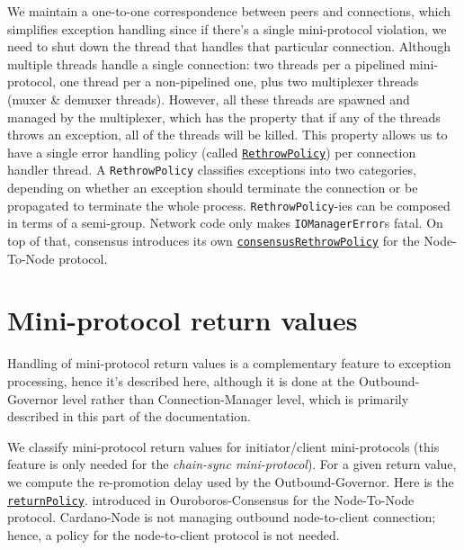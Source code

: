 We maintain a one-to-one correspondence between peers and connections, which
simplifies exception handling since if there's a single mini-protocol
violation, we need to shut down the thread that handles that particular
connection.  Although multiple threads handle a single connection: two
threads per a pipelined mini-protocol, one thread per a non-pipelined one, plus
two multiplexer threads (muxer \& demuxer threads).  However, all these threads
are spawned and managed by the multiplexer, which has the property that if any
of the threads throws an exception, all of the threads will be killed.  This
property allows us to have a single error handling policy (called
\href{https://ouroboros-network.cardano.intersectmbo.org/ouroboros-network-framework/Ouroboros-Network-RethrowPolicy.html\#t:RethrowPolicy}{\texttt{RethrowPolicy}})
per connection handler thread. A \texttt{RethrowPolicy} classifies exceptions
into two categories, depending on whether an exception should terminate the
connection or be propagated to terminate the whole process.
\texttt{RethrowPolicy}-ies can be composed in terms of a semi-group.  Network
code only makes \texttt{IOManagerError}s fatal.  On top of that, consensus
introduces its own
\href{https://ouroboros-consensus.cardano.intersectmbo.org/haddocks/ouroboros-consensus-diffusion/Ouroboros-Consensus-Node-RethrowPolicy.html\#v:consensusRethrowPolicy}{\texttt{consensusRethrowPolicy}}
for the Node-To-Node protocol.

\section{Mini-protocol return values}
\label{sec:mini-protocol-return-values}

Handling of mini-protocol return values is a complementary feature to exception
processing, hence it's described here, although it is done at the
Outbound-Governor level rather than Connection-Manager level, which is primarily
described in this part of the documentation.

We classify mini-protocol return values for initiator/client mini-protocols
(this feature is only needed for the \textit{chain-sync
mini-protocol}). For a given return value, we compute the re-promotion delay used by
the Outbound-Governor. Here is the
\href{https://ouroboros-consensus.cardano.intersectmbo.org/haddocks/ouroboros-consensus-diffusion/Ouroboros-Consensus-Node-ExitPolicy.html\#v:returnPolicy}{\texttt{returnPolicy}}.
introduced in Ouroboros-Consensus for the Node-To-Node protocol.  Cardano-Node
is not managing outbound node-to-client connection; hence, a policy for
the node-to-client protocol is not needed.

